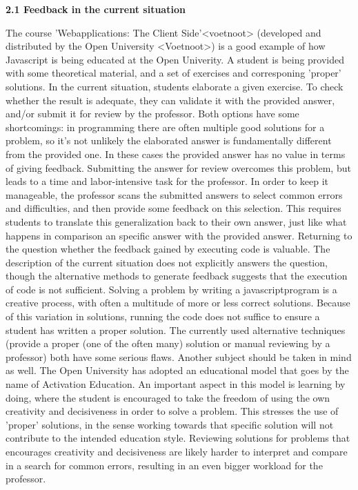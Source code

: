 \documentclass{article}
\begin{document}
\textbf{2.1 Feedback in the current situation}

\noindent
The course 'Webapplications: The Client Side'<voetnoot> (developed and distributed by the Open University <Voetnoot>) is a good example of how Javascript is being educated at the Open Univerity. A student is being provided with some theoretical material, and a set of exercises and corresponing 'proper' solutions. In the current situation, students elaborate a given exercise. To check whether the result is adequate, they can validate it with the provided answer, and/or submit it for review by the professor. Both options have some shortcomings: in programming there are often multiple good solutions for a problem, so it’s not unlikely the elaborated answer is fundamentally different from the provided one. In these cases the provided answer has no value in terms of giving feedback. Submitting the answer for review overcomes this problem, but leads to a time and labor-intensive task for the professor. In order to keep it manageable, the professor scans the submitted answers to select common errors and difficulties, and then provide some feedback on this selection. This requires students to translate this generalization back to their own answer, just like what happens in comparison an specific answer with the provided answer.
\newline
Returning to the question whether the feedback gained by executing code is valuable. The description of the current situation does not explicitly answers the question, though the alternative methods to generate feedback suggests that the execution of code is not sufficient. Solving a problem by writing a javascriptprogram is a creative process, with often a multitude of more or less correct solutions. Because of this variation in solutions, running the code does not suffice to ensure a student has written a proper solution. The currently used alternative techniques (provide a proper (one of the often many) solution or manual reviewing by a professor) both have some serious flaws. 
\newline
Another subject should be taken in mind as well. The Open University has adopted an educational model that goes by the name of Activation Education. An important aspect in this model is learning by doing, where the student is encouraged to take the freedom of using the own creativity and decisiveness in order to solve a problem. This stresses the use of 'proper' solutions, in the sense working towards that specific solution will not contribute to the intended education style. Reviewing solutions for problems that encourages creativity and decisiveness are likely harder to interpret and compare in a search for common errors, resulting in an even bigger workload for the professor. 
\end{document}
